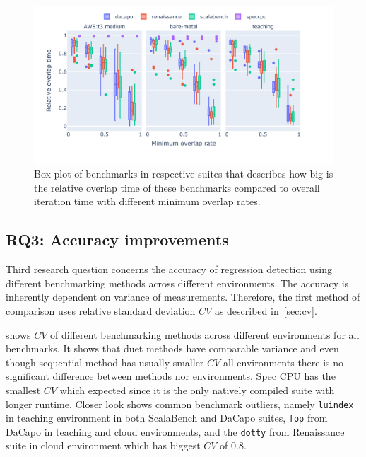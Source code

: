 \begin{figure}
	\centering
	\includegraphics[width=1\linewidth]{./figures/relative_overlap_time.pdf}
	\caption{
		Box plot of benchmarks in respective suites that describes how big is the relative overlap time of these benchmarks compared to overall iteration time with different minimum overlap rates.
	}
	\label{fig:relative_overlap_time}
\end{figure}


\subsection{RQ3: Accuracy improvements}
\label{sec:rq3}

Third research question concerns the accuracy of regression detection using different benchmarking methods across different environments.
The accuracy is inherently dependent on variance of measurements.
Therefore, the first method of comparison uses relative standard deviation $CV$ as described in~\cref{sec:cv}.

 shows $CV$ of different benchmarking methods across different environments for all benchmarks.
It shows that duet methods have comparable variance and even though sequential method has usually smaller $CV$ all environments there is no significant difference between methods nor environments.
Spec CPU has the smallest $CV$ which expected since it is the only natively compiled suite with longer runtime.
Closer look shows common benchmark outliers, namely \lstinline{luindex} in teaching environment in both ScalaBench and DaCapo suites, \lstinline{fop} from DaCapo in teaching and cloud environments, and the \lstinline{dotty} from Renaissance suite in cloud environment which has biggest $CV$ of $0.8$.

